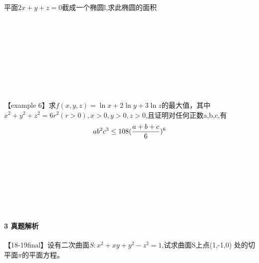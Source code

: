 \documentclass[12pt]{scrartcl}
\begin{document}
{平面$2x+y+z=0$截成一个椭圆l,求此椭圆的面积 \\
\\
\\
\\
\\
\\
\\
\\
\\
\\
【example 6】求$f(x,y,z)=\ln x+2\ln y+3\ln z$的最大值，其中
$x^2+y^2+z^2=6r^2(r>0),x>0,y>0,z>0$,且证明对任何正数a,b,c,有
\begin{equation}
    ab^2c^3\leq 108(\frac{a+b+c}{6})^6 \notag
\end{equation} \\
\\
\\
\\
\\
\\
\\
\paragraph*{\large 3 真题解析}\leavevmode \newline

【18-19final】设有二次曲面$S:x^2+xy+y^2-z^2=1$,试求曲面S上点(1,-1,0)
处的切平面$\pi$的平面方程。\leavevmode \newline
\\
\\
\\
\\
\\
\\
\\
\\
\\

}
\end{document}
